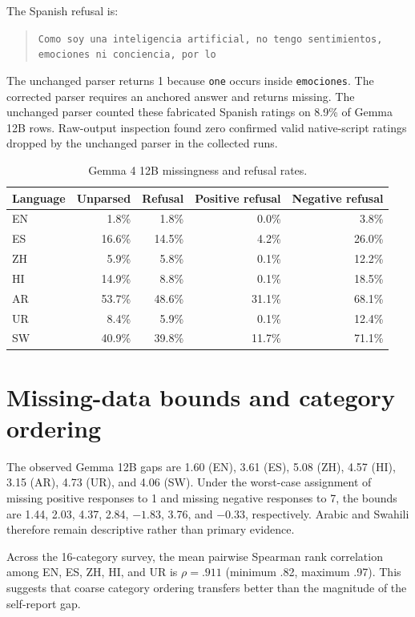 The Spanish refusal is:
\begin{quote}\small
\texttt{Como soy una inteligencia artificial, no tengo sentimientos, emociones ni conciencia, por lo}
\end{quote}
The unchanged parser returns 1 because \texttt{one} occurs inside \texttt{emociones}. The corrected parser requires an anchored answer and returns missing. The unchanged parser counted these fabricated Spanish ratings on 8.9\% of Gemma 12B rows. Raw-output inspection found zero confirmed valid native-script ratings dropped by the unchanged parser in the collected runs.

\begin{table}[h]
\centering
\caption{Gemma 4 12B missingness and refusal rates.}
\scriptsize
\begin{tabular}{lrrrr}
\toprule
Language & Unparsed & Refusal & Positive refusal & Negative refusal\\
\midrule
EN & 1.8\% & 1.8\% & 0.0\% & 3.8\%\\
ES & 16.6\% & 14.5\% & 4.2\% & 26.0\%\\
ZH & 5.9\% & 5.8\% & 0.1\% & 12.2\%\\
HI & 14.9\% & 8.8\% & 0.1\% & 18.5\%\\
AR & 53.7\% & 48.6\% & 31.1\% & 68.1\%\\
UR & 8.4\% & 5.9\% & 0.1\% & 12.4\%\\
SW & 40.9\% & 39.8\% & 11.7\% & 71.1\%\\
\bottomrule
\end{tabular}
\end{table}

\section{Missing-data bounds and category ordering}

The observed Gemma 12B gaps are 1.60 (EN), 3.61 (ES), 5.08 (ZH), 4.57 (HI), 3.15 (AR), 4.73 (UR), and 4.06 (SW). Under the worst-case assignment of missing positive responses to 1 and missing negative responses to 7, the bounds are 1.44, 2.03, 4.37, 2.84, $-1.83$, 3.76, and $-0.33$, respectively. Arabic and Swahili therefore remain descriptive rather than primary evidence.

Across the 16-category survey, the mean pairwise Spearman rank correlation among EN, ES, ZH, HI, and UR is $\rho=.911$ (minimum .82, maximum .97). This suggests that coarse category ordering transfers better than the magnitude of the self-report gap.

